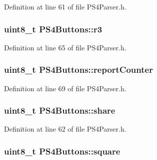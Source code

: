 \-Definition at line 61 of file \-P\-S4\-Parser.\-h.

\hypertarget{union_p_s4_buttons_a09805f3bcc362c410d7897792599d61d}{
\subsubsection[{r3}]{\setlength{\rightskip}{0pt plus 5cm}uint8\-\_\-t {\bf \-P\-S4\-Buttons\-::r3}}}\label{union_p_s4_buttons_a09805f3bcc362c410d7897792599d61d}


\-Definition at line 65 of file \-P\-S4\-Parser.\-h.

\hypertarget{union_p_s4_buttons_a5c27c151ad76a3675dce1eda1a3e4cc4}{
\subsubsection[{report\-Counter}]{\setlength{\rightskip}{0pt plus 5cm}uint8\-\_\-t {\bf \-P\-S4\-Buttons\-::report\-Counter}}}\label{union_p_s4_buttons_a5c27c151ad76a3675dce1eda1a3e4cc4}


\-Definition at line 69 of file \-P\-S4\-Parser.\-h.

\hypertarget{union_p_s4_buttons_adf2ff3e6e4050070a68e90a83be81e92}{
\subsubsection[{share}]{\setlength{\rightskip}{0pt plus 5cm}uint8\-\_\-t {\bf \-P\-S4\-Buttons\-::share}}}\label{union_p_s4_buttons_adf2ff3e6e4050070a68e90a83be81e92}


\-Definition at line 62 of file \-P\-S4\-Parser.\-h.

\hypertarget{union_p_s4_buttons_a84eb7076098ec3135bdc440a279fde50}{
\subsubsection[{square}]{\setlength{\rightskip}{0pt plus 5cm}uint8\-\_\-t {\bf \-P\-S4\-Buttons\-::square}}}\label{union_p_s4_buttons_a84eb7076098ec3135bdc440a279fde50}



